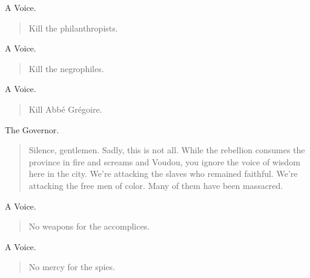 \documentclass[letterpaper,article,12pt,oneside,notitlepage]{memoir}
\begin{document}
\begin{center}A Voice.\end{center}

\begin{verse}
\hspace{1cm} Kill the philanthropists. \\
\end{verse}

\clearpage

\begin{center}A Voice.\end{center}

\begin{verse}
\hspace{1cm} Kill the negrophiles. \\
\end{verse}

\begin{center}A Voice.\end{center}

\begin{verse}
\hspace{1cm} Kill Abbé Grégoire. \\
\end{verse}

\begin{center}The Governor.\end{center}

\begin{verse}
\indent Silence, gentlemen. Sadly, this is not all. While the rebellion consumes the province in fire and screams and Voudou, you ignore the voice of wisdom here in the city. We're attacking the slaves who remained faithful. We're attacking the free men of color. Many of them have been massacred. \\
\end{verse}

\begin{center}A Voice.\end{center}

\begin{verse}
\hspace{1cm} No weapons for the accomplices. \\
\end{verse}

\begin{center}A Voice.\end{center}

\begin{verse}
\hspace{1cm} No mercy for the spies. \\
\end{verse}
\end{document}
